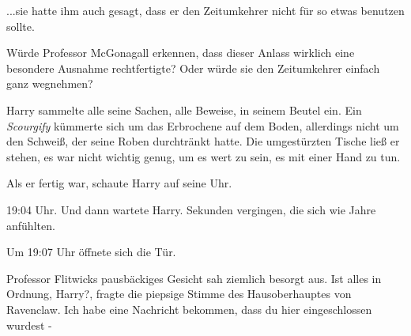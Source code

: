 ...sie hatte ihm auch gesagt, dass er den Zeitumkehrer nicht für so etwas
benutzen sollte.

Würde Professor McGonagall erkennen, dass dieser Anlass wirklich eine besondere
Ausnahme rechtfertigte? Oder würde sie den Zeitumkehrer einfach ganz wegnehmen?

Harry sammelte alle seine Sachen, alle Beweise, in seinem Beutel ein. Ein
\emph{Scourgify} kümmerte sich um das Erbrochene auf dem Boden, allerdings nicht
um den Schweiß, der seine Roben durchtränkt hatte. Die umgestürzten Tische ließ
er stehen, es war nicht wichtig genug, um es wert zu sein, es mit einer Hand zu
tun.

Als er fertig war, schaute Harry auf seine Uhr.

19:04 Uhr. Und dann wartete Harry. Sekunden vergingen, die sich wie Jahre
anfühlten.

Um 19:07 Uhr öffnete sich die Tür.

Professor Flitwicks pausbäckiges Gesicht sah ziemlich besorgt aus. \glqq Ist
alles in Ordnung, Harry?\grqq{}, fragte die piepsige Stimme des Hausoberhauptes
von Ravenclaw. \glqq Ich habe eine Nachricht bekommen, dass du hier
eingeschlossen wurdest -\grqq{}
